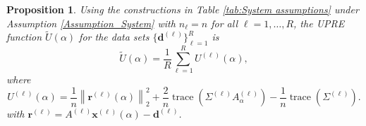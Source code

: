 \documentclass[12pt]{article}
\newcommand{\dVec}{\mathbf{d}}	%
\newcommand{\rVec}{\mathbf{r}}	%
\newcommand{\xVec}{\mathbf{x}}	%
\DeclareMathOperator{\trace}{trace}		%
\newcommand{\regparam}{\alpha}
\newcommand{\U}{U}	%
\newtheorem{proposition}{Proposition}[section]
\begin{document}
\begin{proposition}
Using the constructions in Table \ref{tab:System assumptions} under Assumption \ref{Assumption_System} with $n_\ell = n$ for all $\ell = 1,\ldots,R$, the UPRE function $\widetilde{U}(\regparam)$ for the data sets $\{\dVec^{(\ell)}\}_{\ell=1}^R$ is
\begin{equation}
\label{eq:Averaged UPRE}
\widetilde{\U}(\regparam) = \frac{1}{R} \sum_{\ell=1}^R \U^{(\ell)}(\regparam),
\end{equation}
where
\begin{equation}
\label{eq:Individual UPRE}
\U^{(\ell)}(\regparam) = \frac{1}{n}\left\|\rVec^{(\ell)}(\regparam)\right\|_2^2 + \frac{2}{n} \trace\left(\Sigma^{(\ell)} A_\regparam^{(\ell)}\right) - \frac{1}{n} \trace\left(\Sigma^{(\ell)}\right).
\end{equation}
with $\rVec^{(\ell)} = A^{(\ell)}\xVec^{(\ell)}(\regparam) - \dVec^{(\ell)}$.
\end{proposition}
\end{document}
